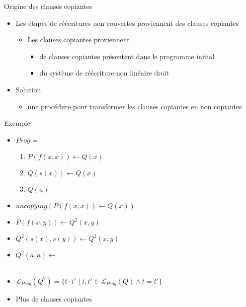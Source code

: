 \begin{frame}{Origine des clauses copiantes}
  \begin{itemize}[<+->]
  \item Les étapes de réécritures non couvertes proviennent des clauses copiantes
    \begin{itemize}
    \item Les clauses copiantes proviennent
      \begin{itemize}
      \item de clauses copiantes présentent dans le programme initial
      \item du système de réécriture non linéaire droit
      \end{itemize}
    \end{itemize}
    \vspace{\baselineskip}
  \item Solution
    \begin{itemize}
    \item une procédure pour transformer les clauses copiantes en non copiantes
    \end{itemize}
  \end{itemize}
\end{frame}

\begin{frame}{Exemple}
  \begin{itemize}[<+->]
  \item $Prog$ =
    \begin{enumerate}
    \item $P(f(x,x)) \leftarrow Q(x)$
    \item {}$Q(s(x)) \leftarrow Q(x)$
    \item {}$Q(a) $
    \end{enumerate}
    \vspace{\baselineskip}

  \item $uncopying(P(f(x,x)) \leftarrow Q(x))$
  \item $P(f(x,y)) \leftarrow Q^2(x, y)$
  \item $Q^2(s(x),s(y)) \leftarrow Q^2(x,y)$
  \item $Q^2(a,a) \leftarrow $ \\~

  \item $\mathcal{L}_{Prog}(Q^2) = \{t \cdot t' \mid t,t' \in \mathcal{L}_{Prog}(Q) \wedge t = t'\}$
  \item Plus de clauses copiantes
  \end{itemize}
    
\end{frame}

